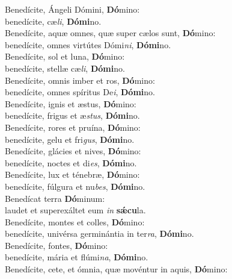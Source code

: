 \evenverse Benedícite, Ángeli Dómini, \textbf{Dó}mino:~\*\\
\evenverse benedícite, cæ\textit{li}, \textbf{Dó}\textbf{mi}no.\\
\oddverse Benedícite, aquæ omnes, quæ super cælos sunt, \textbf{Dó}mino:~\*\\
\oddverse benedícite, omnes virtútes Dómi\textit{ni}, \textbf{Dó}\textbf{mi}no.\\
\evenverse Benedícite, sol et luna, \textbf{Dó}mino:~\*\\
\evenverse benedícite, stellæ cæ\textit{li}, \textbf{Dó}\textbf{mi}no.\\
\oddverse Benedícite, omnis imber et ros, \textbf{Dó}mino:~\*\\
\oddverse benedícite, omnes spíritus De\textit{i}, \textbf{Dó}\textbf{mi}no.\\
\evenverse Benedícite, ignis et æstus, \textbf{Dó}mino:~\*\\
\evenverse benedícite, frigus et æ\textit{stus}, \textbf{Dó}\textbf{mi}no.\\
\oddverse Benedícite, rores et pruína, \textbf{Dó}mino:~\*\\
\oddverse benedícite, gelu et fri\textit{gus}, \textbf{Dó}\textbf{mi}no.\\
\evenverse Benedícite, glácies et nives, \textbf{Dó}mino:~\*\\
\evenverse benedícite, noctes et di\textit{es}, \textbf{Dó}\textbf{mi}no.\\
\oddverse Benedícite, lux et ténebræ, \textbf{Dó}mino:~\*\\
\oddverse benedícite, fúlgura et nu\textit{bes}, \textbf{Dó}\textbf{mi}no.\\
\evenverse Benedícat terra \textbf{Dó}minum:~\*\\
\evenverse laudet et superexáltet eum \textit{in} \textbf{sǽ}\textbf{cu}la.\\
\oddverse Benedícite, montes et colles, \textbf{Dó}mino:~\*\\
\oddverse benedícite, univérsa germinántia in ter\textit{ra}, \textbf{Dó}\textbf{mi}no.\\
\evenverse Benedícite, fontes, \textbf{Dó}mino:~\*\\
\evenverse benedícite, mária et flúmi\textit{na}, \textbf{Dó}\textbf{mi}no.\\
\oddverse Benedícite, cete, et ómnia, quæ movéntur in aquis, \textbf{Dó}mino:~\*\\
